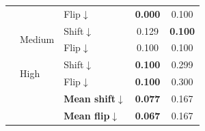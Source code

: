 \begin{table}[t]
\begin{tabular}{@{}lllcc@{}}
 &  & Flip$\downarrow$ & \textbf{0.000} & 0.100 \\
 & \multirow{2}{*}{Medium} & Shift$\downarrow$ & 0.129 & \textbf{0.100} \\
 &  & Flip$\downarrow$ & 0.100 & 0.100 \\
 & \multirow{2}{*}{High} & Shift$\downarrow$ & \textbf{0.100} & 0.299 \\
 &  & Flip$\downarrow$ & \textbf{0.100} & 0.300 \\
 & & \textbf{Mean shift}$\downarrow$ & \textbf{0.077} & 0.167 \\
 & & \textbf{Mean flip}$\downarrow$ & \textbf{0.067} & 0.167 \\
\bottomrule
\end{tabular}\end{table}